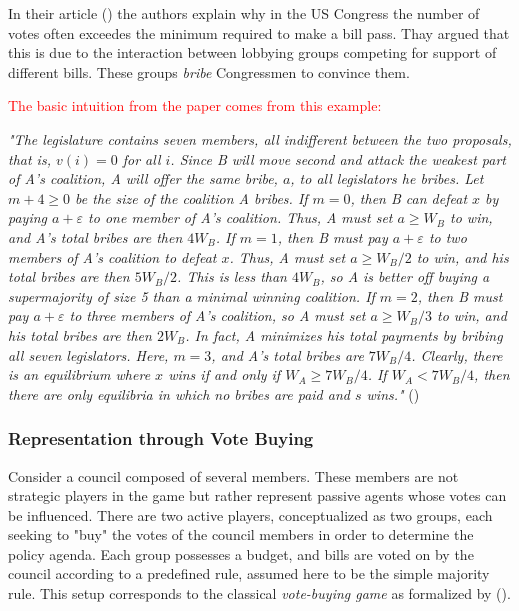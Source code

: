 \vspace*{1em}
In their article (\cite{grosecloseBuyingSupermajorities1996}) the authors explain why in the US Congress the number of votes often exceedes the minimum required to make a bill pass. Thay argued that this is due to the interaction between lobbying groups competing for support of different bills. These groups \textit{bribe} Congressmen to convince them. 

\vspace*{1em}
\textcolor{red}{The basic intuition from the paper comes from this example:}

\vspace{1em}
\textit{ "The legislature contains seven members, all indifferent between the two proposals, that is, $v(i) = 0$ for all $i$. Since B will move second and attack the weakest part of A’s coalition, A will offer the same bribe, $a$, to all legislators he bribes. Let $m + 4 \ge 0$ be the size of the coalition A bribes. If $m = 0$, then B can defeat $x$ by paying $a + \varepsilon$ to one member of A’s coalition. Thus, A must set $a \ge W_B$ to win, and A’s total bribes are then $4W_B$. If $m = 1$, then B must pay $a + \varepsilon$ to two members of A’s coalition to defeat $x$. Thus, A must set $a \ge W_B/2$ to win, and his total bribes are then $5W_B/2$. This is less than $4W_B$, so A is better off buying a supermajority of size 5 than a minimal winning coalition. If $m = 2$, then B must pay $a + \varepsilon$ to three members of A’s coalition, so A must set $a \ge W_B/3$ to win, and his total bribes are then $2W_B$. In fact, A minimizes his total payments by bribing all seven legislators. Here, $m = 3$, and A’s total bribes are $7W_B/4$. Clearly, there is an equilibrium where $x$ wins if and only if $W_A \ge 7W_B/4$. If $W_A < 7W_B/4$, then there are only equilibria in which no bribes are paid and $s$ wins."} (\cite{grosecloseBuyingSupermajorities1996})


\subsubsection*{Representation through Vote Buying}
Consider a council composed of several members. These members are not strategic players in the game but rather represent passive agents whose votes can be influenced.  
There are two active players, conceptualized as two groups, each seeking to "buy" the votes of the council members in order to determine the policy agenda.  
Each group possesses a budget, and bills are voted on by the council according to a predefined rule, assumed here to be the simple majority rule.  
This setup corresponds to the classical \textit{vote-buying game} as formalized by (\cite{grosecloseBuyingSupermajorities1996}).

